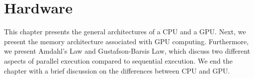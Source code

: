 \chapter{Hardware}
\label{chap:hardware}

This chapter presents the general architectures of a CPU and a GPU.
Next, we present the memory architecture associated with GPU computing.
Furthermore, we present Amdahl's Law and Gustafson-Barsis Law, which discuss two different aspects of parallel execution compared to sequential execution.
We end the chapter with a brief discussion on the differences between CPU and GPU.






